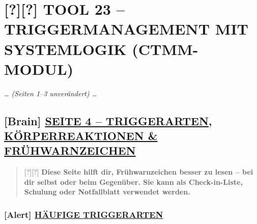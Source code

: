 \hypertarget{tool-23-triggermanagement-mit-systemlogik-ctmm-modul}{%
\section{\texorpdfstring{\textbf{[?][?] TOOL 23 -- TRIGGERMANAGEMENT MIT SYSTEMLOGIK (CTMM-MODUL)}}{[?][?] TOOL 23 -- TRIGGERMANAGEMENT MIT SYSTEMLOGIK (CTMM-MODUL)}}\label{tool-23-triggermanagement-mit-systemlogik-ctmm-modul}}

\emph{\ldots{} (Seiten 1--3 unverändert) \ldots{}}

\hypertarget{seite-4-triggerarten-kuxf6rperreaktionen-fruxfchwarnzeichen}{%
\subsection{\texorpdfstring{\textbf{[Brain] \ul{SEITE 4 -- TRIGGERARTEN, KÖRPERREAKTIONEN \& FRÜHWARNZEICHEN}}}{[Brain] SEITE 4 -- TRIGGERARTEN, KÖRPERREAKTIONEN \& FRÜHWARNZEICHEN}}\label{seite-4-triggerarten-kuxf6rperreaktionen-fruxfchwarnzeichen}}

\begin{quote}
[?][?] \textbf{Diese Seite hilft dir, Frühwarnzeichen besser zu lesen -- bei dir selbst oder beim Gegenüber. Sie kann als Check-in-Liste, Schulung oder Notfallblatt verwendet werden.}
\end{quote}

\hypertarget{huxe4ufige-triggerarten}{%
\subsubsection{\texorpdfstring{\textbf{[Alert] \ul{HÄUFIGE TRIGGERARTEN}}}{[Alert] HÄUFIGE TRIGGERARTEN}}\label{huxe4ufige-triggerarten}}

